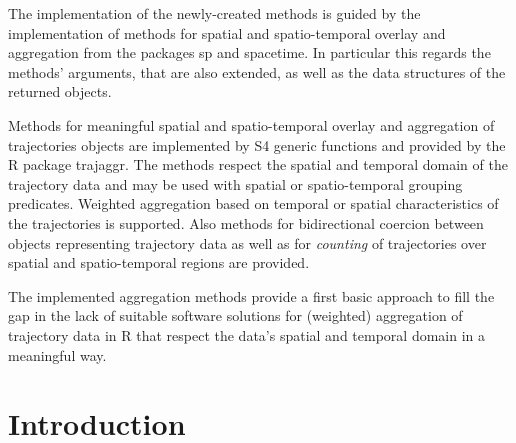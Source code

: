\documentclass[12pt, oneside, a4paper]{scrbook}
\newcommand{\pkg}[1]{{\normalfont\fontseries{b}\selectfont #1}}
\let\proglang=\textsf
\begin{document}
The implementation of the newly-created methods is guided by the implementation of methods for spatial and spatio-temporal overlay and aggregation from the packages \pkg{sp} and \pkg{spacetime}. 
In particular this regards the methods' arguments, that are also extended, as well as the data structures of the returned objects.

Methods for meaningful spatial and spatio-temporal overlay and aggregation of \pkg{trajectories} objects are implemented by S4 generic functions and provided by the \proglang{R} package \pkg{trajaggr}.
The methods respect the spatial and temporal domain of the trajectory data and may be used with spatial or spatio-temporal grouping predicates. 
Weighted aggregation based on temporal or spatial characteristics of the trajectories is supported. 
Also methods for bidirectional coercion between objects representing trajectory data as well as for \textit{counting} of trajectories over spatial and spatio-temporal regions are provided.

The implemented aggregation methods provide a first basic approach to fill the gap in the lack of suitable software solutions for (weighted) aggregation of trajectory data in \proglang{R} that respect the data's spatial and temporal domain in a meaningful way.






\mainmatter






\chapter{Introduction}
\end{document}

